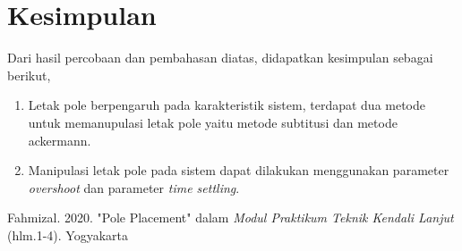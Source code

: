 \documentclass[../main.tex]{subfiles}
\begin{document}
    \section{Kesimpulan}
        Dari hasil percobaan dan pembahasan diatas, didapatkan kesimpulan sebagai berikut,
        \begin{enumerate}
            \item Letak pole berpengaruh pada karakteristik sistem, terdapat dua metode untuk memanupulasi letak pole yaitu metode subtitusi dan metode ackermann.
            \item Manipulasi letak pole pada sistem dapat dilakukan menggunakan parameter \textit{overshoot} dan parameter \textit{time settling}.
        \end{enumerate}
    \begin{thebibliography}{2}
         Fahmizal. 2020. "Pole Placement" dalam \textit{Modul Praktikum Teknik Kendali Lanjut} (hlm.1-4). Yogyakarta
    \end{thebibliography}
\end{document}
